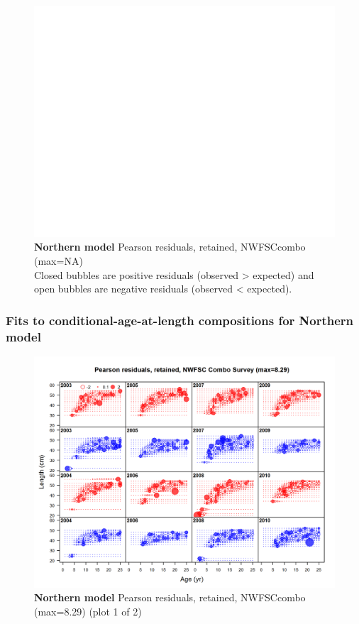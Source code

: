 \documentclass[12pt,]{article}
\begin{document}
\begin{figure}[htbp]
\centering
\includegraphics{./r4ss/plots_mod1/comp_gstagefit_residsflt6mkt2.png}
\caption{\textbf{Northern model} Pearson residuals, retained, NWFSCcombo
(max=NA)\\
Closed bubbles are positive residuals (observed \textgreater{} expected)
and open bubbles are negative residuals (observed \textless{} expected).
\label{fig:mod1_18_comp_gstagefit_residsflt6mkt2}}
\end{figure}

\FloatBarrier

\newpage

\subsubsection{Fits to conditional-age-at-length compositions for
Northern
model}\label{fits-to-conditional-age-at-length-compositions-for-northern-model}

\begin{figure}[htbp]
\centering
\includegraphics{./r4ss/plots_mod1/comp_condAALfit_residsflt6mkt2_page1.png}
\caption{\textbf{Northern model} Pearson residuals, retained, NWFSCcombo
(max=8.29) (plot 1 of 2)
\label{fig:mod1_1_comp_condAALfit_residsflt6mkt2_page1}}
\end{figure}
\end{document}
